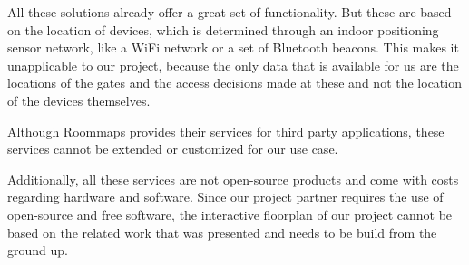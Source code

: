 All these solutions already offer a great set of functionality. But these are based on the location of devices, which is determined through an indoor positioning sensor network, like a WiFi network or a set of Bluetooth beacons. This makes it unapplicable to our project, because the only data that is available for us are the locations of the gates and the access decisions made at these and not the location of the devices themselves.

Although Roommaps provides their services for third party applications, these services cannot be extended or customized for our use case. 

Additionally, all these services are not open-source products and come with costs regarding hardware and software. Since our project partner requires the use of open-source and free software, the interactive floorplan of our project cannot be based on the related work that was presented and needs to be build from the ground up.

\clearpage